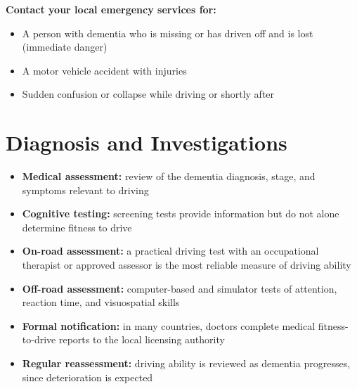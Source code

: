\textbf{Contact your local emergency services for:}
\begin{itemize}
    \item A person with dementia who is missing or has driven off and is lost (immediate danger)
    \item A motor vehicle accident with injuries
    \item Sudden confusion or collapse while driving or shortly after
\end{itemize}

\section*{Diagnosis and Investigations}
\begin{itemize}
    \item \textbf{Medical assessment:} review of the dementia diagnosis, stage, and symptoms relevant to driving
    \item \textbf{Cognitive testing:} screening tests provide information but do not alone determine fitness to drive
    \item \textbf{On-road assessment:} a practical driving test with an occupational therapist or approved assessor is the most reliable measure of driving ability
    \item \textbf{Off-road assessment:} computer-based and simulator tests of attention, reaction time, and visuospatial skills
    \item \textbf{Formal notification:} in many countries, doctors complete medical fitness-to-drive reports to the local licensing authority
    \item \textbf{Regular reassessment:} driving ability is reviewed as dementia progresses, since deterioration is expected
\end{itemize}

